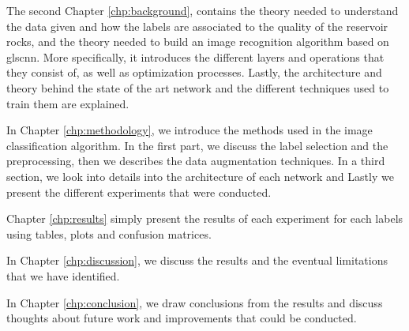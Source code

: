 The second Chapter \ref{chp:background}, contains the theory needed to understand the data given and how the labels are associated to the quality of the reservoir rocks, and the theory needed to build an image recognition algorithm based on gls{cnn}. More specifically, it introduces the different layers and operations that they consist of, as well as optimization processes. Lastly, the architecture and theory behind the state of the art network and the different techniques used to train them are explained.
 

In Chapter \ref{chp:methodology}, we introduce the methods used in the image classification algorithm. In the first part, we discuss the label selection and the preprocessing, then we describes the data augmentation techniques. In a third section, we look into details into the architecture of each network and Lastly we present the different experiments that were conducted.  


Chapter  \ref{chp:results} simply present the results of each experiment for each labels using tables, plots and confusion matrices.


In Chapter \ref{chp:discussion}, we discuss the results and the eventual limitations that we have identified.


In Chapter \ref{chp:conclusion}, we draw conclusions from the results and discuss thoughts about future work and improvements that could be conducted. 
